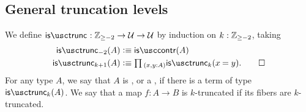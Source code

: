 \begin{comment}
\begin{thm}[Hedberg]\label{thm:dec_eq}
Any type with decidable equality is a set.
\end{thm}

\begin{proof}
Let $A$ be a type, and let $d:\prd{x,y:A}(\id{x}{y})+\neg(\id{x}{y})$ be the witness that $A$ has decidable equality.
We first construct a reflexive binary relation $E:A\to A\to\type$ such that each $E(x,y)$ is a proposition.
For every $x,y:A$, we first define a type family $E'(x,y):((\id{x}{y})+\neg(\id{x}{y}))\to\type$ by
\begin{align*}
E'(x,y,\inl(p)) & \defeq \unit \\
E'(x,y,\inr(p)) & \defeq \emptyt.
\end{align*}
Note that $E'(x,y,q)$ is a proposition for each $x,y:A$ and $q:(\id{x}{y})+\neg(\id{x}{y})$. 
Now we set $E(x,y)\defeq E'(x,y,d(x,y))$. Then $E$ is clearly reflexive, and a family of propositions.
Therefore it remains to show that $E$ implies identity. 

Since $E$ is defined as an instance of $E'$, it suffices to construct a term of type
\begin{equation*}
\prd{x,y:A}\prd{q:(\id{x}{y})+\neg(\id{x}{y})} E'(q)\to (\id{x}{y}). 
\end{equation*}
By induction of disjoint sums, it suffices to construct terms of types
\begin{align*}
& \prd{x,y:A}\prd{p:\id{x}{y}} \unit\to (\id{x}{y}) \\
& \prd{x,y:A}\prd{p:\neg(\id{x}{y})} \emptyt\to (\id{x}{y}).
\end{align*}
In the first case, we take $\lam{x}\lam{y}\lam{p}{t}p$, and the second case is by induction on the empty type.
\end{proof}
\end{comment}

\subsection{General truncation levels}

\begin{defn}
We define $\istrunc{} : \Z_{\geq-2}\to\UU\to\UU$ by induction on $k:{\mathbb{Z}}_{\geq -2}$, taking
\begin{align*}
\istrunc{-2}(A) & \defeq \iscontr(A) \\
\istrunc{k+1}(A) & \defeq \prd{x,y:A}\istrunc{k}(\id{x}{y}).\qedhere
\end{align*}
For any type $A$, we say that $A$ is , or a , if there is a term of type $\istrunc{k}(A)$. We say that a map $f:A\to B$ is $k$-truncated if its fibers are $k$-truncated.
\end{defn}

